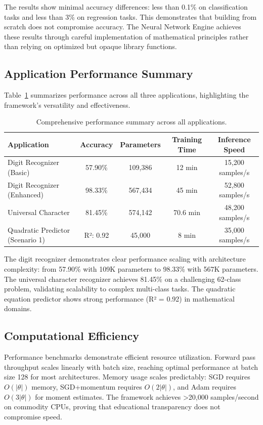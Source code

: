 \documentclass[11pt,a4paper]{report}
\begin{document}
The results show minimal accuracy differences: less than 0.1\% on classification tasks and less than 3\% on regression tasks. This demonstrates that building from scratch does not compromise accuracy. The Neural Network Engine achieves these results through careful implementation of mathematical principles rather than relying on optimized but opaque library functions.

\subsection{Application Performance Summary}

Table~\ref{tab:application_summary} summarizes performance across all three applications, highlighting the framework's versatility and effectiveness.

\begin{table}[H]
\centering
\caption{Comprehensive performance summary across all applications.}
\label{tab:application_summary}
\begin{tabular}{lcccc}
\toprule
Application & Accuracy & Parameters & Training Time & Inference Speed \\
\midrule
Digit Recognizer (Basic) & 57.90\% & 109,386 & 12 min & 15,200 samples/s \\
Digit Recognizer (Enhanced) & 98.33\% & 567,434 & 45 min & 52,800 samples/s \\
Universal Character & 81.45\% & 574,142 & 70.6 min & 48,200 samples/s \\
Quadratic Predictor (Scenario 1) & R²: 0.92 & 45,000 & 8 min & 35,000 samples/s \\
\bottomrule
\end{tabular}
\end{table}

The digit recognizer demonstrates clear performance scaling with architecture complexity: from 57.90\% with 109K parameters to 98.33\% with 567K parameters. The universal character recognizer achieves 81.45\% on a challenging 62-class problem, validating scalability to complex multi-class tasks. The quadratic equation predictor shows strong performance (R² = 0.92) in mathematical domains.

\subsection{Computational Efficiency}

Performance benchmarks demonstrate efficient resource utilization. Forward pass throughput scales linearly with batch size, reaching optimal performance at batch size 128 for most architectures. Memory usage scales predictably: SGD requires $O(|\theta|)$ memory, SGD+momentum requires $O(2|\theta|)$, and Adam requires $O(3|\theta|)$ for moment estimates. The framework achieves >20,000 samples/second on commodity CPUs, proving that educational transparency does not compromise speed.
\end{document}
